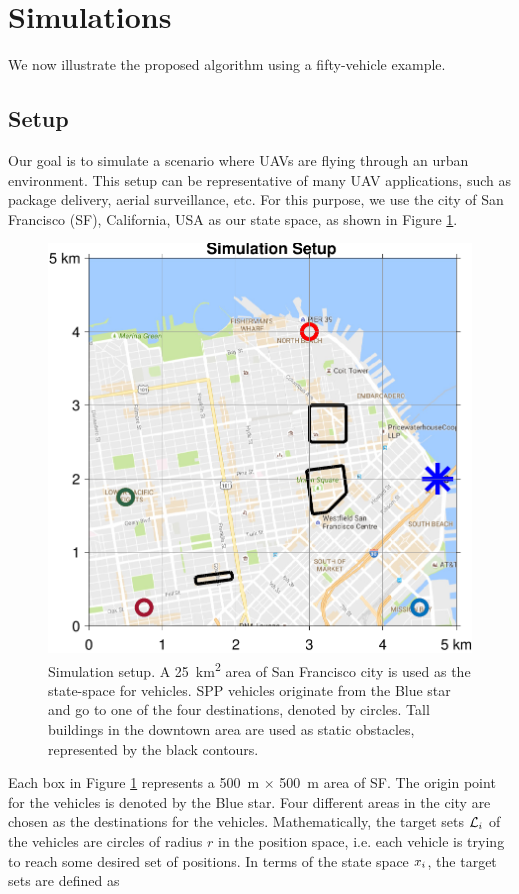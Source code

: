 \section{Simulations \label{sec:simulations}}
We now illustrate the proposed algorithm using a fifty-vehicle example. 

\subsection{Setup \label{sec:simSetup}}
Our goal is to simulate a scenario where UAVs are flying through an urban environment. This setup can be representative of many UAV applications, such as package delivery, aerial surveillance, etc. For this purpose, we use the city of San Francisco (SF), California, USA as our state space, as shown in Figure \ref{fig:sf_setup}. 
\begin{figure}[H]
  \centering
  \includegraphics[width=\columnwidth]{"figs/sf_setup"}
  \caption{Simulation setup. A \SI{25}{\km\squared} area of San Francisco city is used as the state-space for vehicles. SPP vehicles originate from the Blue star and go to one of the four destinations, denoted by circles. Tall buildings in the downtown area are used as static obstacles, represented by the black contours.}
  \label{fig:sf_setup}
\end{figure}
Each box in Figure \ref{fig:sf_setup} represents a \SI{500}{\m} $\times$ \SI{500}{\m} area of SF. The origin point for the vehicles is denoted by the Blue star. Four different areas in the city are chosen as the destinations for the vehicles. Mathematically, the target sets $\mathcal{L}_i$ of the vehicles are circles of radius $r$ in the position space, i.e. each vehicle is trying to reach some desired set of positions. In terms of the state space $x_i$, the target sets are defined as
